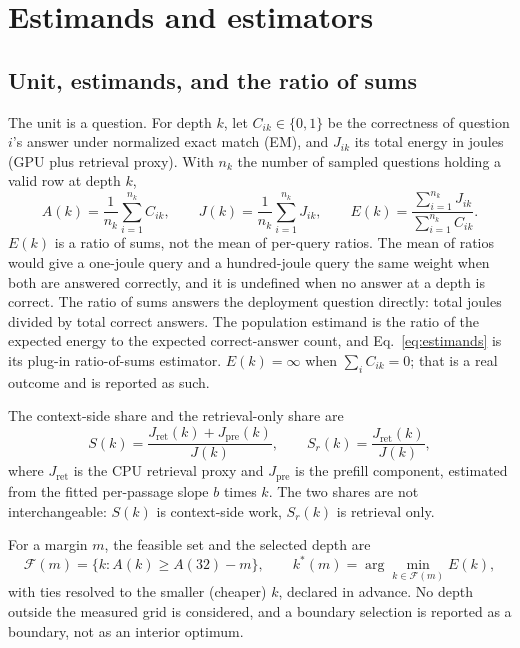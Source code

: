 \documentclass[a4paper,fleqn]{cas-sc}
\begin{document}
\section{Estimands and estimators}\label{sec:s2}

\subsection{Unit, estimands, and the ratio of sums}

The unit is a question. For depth $k$, let $C_{ik}\in\{0,1\}$ be the correctness of question
$i$'s answer under normalized exact match (EM), and $J_{ik}$ its total energy in joules (GPU plus
retrieval proxy). With $n_k$ the number of sampled questions holding a valid row at depth $k$,
\begin{equation}
A(k)=\frac{1}{n_k}\sum_{i=1}^{n_k} C_{ik},
\qquad
J(k)=\frac{1}{n_k}\sum_{i=1}^{n_k} J_{ik},
\qquad
E(k)=\frac{\sum_{i=1}^{n_k} J_{ik}}{\sum_{i=1}^{n_k} C_{ik}}.
\label{eq:estimands}
\end{equation}
$E(k)$ is a ratio of sums, not the mean of per-query ratios. The mean of ratios would give a
one-joule query and a hundred-joule query the same weight when both are answered correctly, and
it is undefined when no answer at a depth is correct. The ratio of sums answers the deployment
question directly: total joules divided by total correct answers. The population estimand is the
ratio of the expected energy to the expected correct-answer count, and Eq.~\ref{eq:estimands} is
its plug-in ratio-of-sums estimator. $E(k)=\infty$ when $\sum_i C_{ik}=0$; that is a real outcome
and is reported as such.

The context-side share and the retrieval-only share are
\begin{equation}
S(k)=\frac{J_{\mathrm{ret}}(k)+J_{\mathrm{pre}}(k)}{J(k)},
\qquad
S_r(k)=\frac{J_{\mathrm{ret}}(k)}{J(k)},
\label{eq:shares}
\end{equation}
where $J_{\mathrm{ret}}$ is the CPU retrieval proxy and $J_{\mathrm{pre}}$ is the prefill
component, estimated from the fitted per-passage slope $b$ times $k$. The two shares are not
interchangeable: $S(k)$ is context-side work, $S_r(k)$ is retrieval only.

For a margin $m$, the feasible set and the selected depth are
\begin{equation}
\mathcal{F}(m)=\{k: A(k)\ge A(32)-m\},
\qquad
k^{*}(m)=\arg\min_{k\in\mathcal{F}(m)} E(k),
\label{eq:feasible}
\end{equation}
with ties resolved to the smaller (cheaper) $k$, declared in advance. No depth outside the
measured grid is considered, and a boundary selection is reported as a boundary, not as an
interior optimum.
\end{document}
